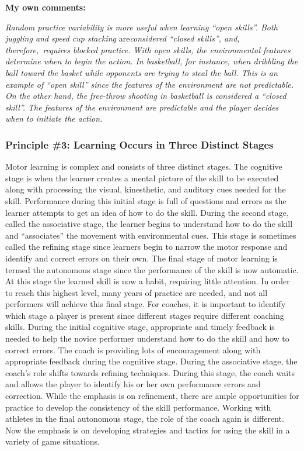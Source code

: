 \documentclass[
  letterpaper,
  DIV=11,
  numbers=noendperiod]{scrartcl}
\begin{document}
\textbf{My own comments:}

\emph{Random practice variability is more useful when learning ``open
skills''. Both juggling and speed cup stacking} are\emph{considered
``closed skills'', and, therefore,~requires blocked practice. With open
skills, the environmental features determine when to begin the action.
In basketball, for instance, when dribbling the ball toward the basket
while opponents are trying to steal the ball. This is an example of
``open skill'' since the features of the environment are not
predictable. On the other hand, the free-throw shooting in basketball is
considered a ``closed skill''. The features of the environment are
predictable and the player decides when to initiate the action.}

\hypertarget{principle-3-learning-occurs-in-three-distinct-stages}{%
\subsubsection{\texorpdfstring{\textbf{Principle \#3: Learning Occurs in
Three Distinct
Stages}}{Principle \#3: Learning Occurs in Three Distinct Stages}}\label{principle-3-learning-occurs-in-three-distinct-stages}}

Motor learning is complex and consists of three distinct stages. The
cognitive stage is when the learner creates a mental picture of the
skill to be executed along with processing the visual, kinesthetic, and
auditory cues needed for the skill. Performance during this initial
stage is full of questions and errors as the learner attempts to get an
idea of how to do the skill. During the second stage, called the
associative stage, the learner begins to understand how to do the skill
and ``associates'' the movement with environmental cues. This stage is
sometimes called the refining stage since learners begin to narrow the
motor response and identify and correct errors on their own. The final
stage of motor learning is termed the autonomous stage since the
performance of the skill is now automatic. At this stage the learned
skill is now a habit, requiring little attention. In order to reach this
highest level, many years of practice are needed, and not all performers
will achieve this final stage. For coaches, it is important to identify
which stage a player is present since different stages require different
coaching skills. During the initial cognitive stage, appropriate and
timely feedback is needed to help the novice performer understand how to
do the skill and how to correct errors. The coach is providing lots of
encouragement along with appropriate feedback during the cognitive
stage. During the associative stage, the coach's role shifts towards
refining techniques. During this stage, the coach waits and allows the
player to identify his or her own performance errors and correction.
While the emphasis is on refinement, there are ample opportunities for
practice to develop the consistency of the skill performance. Working
with athletes in the final autonomous stage, the role of the coach again
is different. Now the emphasis is on developing strategies and tactics
for using the skill in a variety of game situations.
\end{document}
